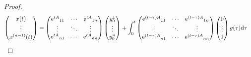 \documentclass[../psets.tex]{subfiles}
\begin{document}
\begin{enumerate}
\begin{proof}
\begin{align*}
            \begin{pmatrix}
                x(t)\\
                \vdots\\
                x^{(n-1)}(t)\\
            \end{pmatrix}
            &=
            \begin{pmatrix}
                {\e[tA]}_{11} & \cdots & {\e[tA]}_{1n}\\
                \vdots & \ddots & \vdots\\
                {\e[tA]}_{n1} & \cdots & {\e[tA]}_{nn}\\
            \end{pmatrix}
            \begin{pmatrix}
                y_0^1\\
                \vdots\\
                y_0^n\\
            \end{pmatrix}
            +\int_0^t
            \begin{pmatrix}
                {\e[(t-\tau)A]}_{11} & \cdots & {\e[(t-\tau)A]}_{1n}\\
                \vdots & \ddots & \vdots\\
                {\e[(t-\tau)A]}_{n1} & \cdots & {\e[(t-\tau)A]}_{nn}\\
            \end{pmatrix}
            \begin{pmatrix}
                0\\
                \vdots\\
                1\\
            \end{pmatrix}
            g(\tau)\dd\tau

\end{align*}
\end{proof}
\end{enumerate}
\end{document}
